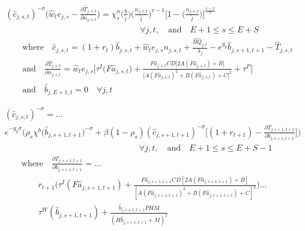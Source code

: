 \begin{spacing}{1.5}
    \begin{equation}\label{EqEulerLabStat}
      \begin{split}
        &(\hat{c}_{j,s,t})^{-\sigma}\Biggl(\hat{w}_t e_{j,s} - \frac{\partial\hat{T}_{j,s,t}}{\partial n_{j,s,t}}\Biggr) = \chi^n_{s}\biggl(\frac{b}{\tilde{l}}\biggr)\biggl(\frac{n_{j,s,t}}{\tilde{l}}\biggr)^{v-1}\Biggl[1 - \biggl(\frac{n_{j,s,t}}{\tilde{l}}\biggr)\Biggr]^{\frac{1-v}{v}} \\
        &\qquad\qquad\qquad\qquad\qquad\qquad\qquad\qquad\forall j,t, \quad\text{and}\quad E+1\leq s\leq E+S \\
        &\qquad\text{where}\quad \hat{c}_{j,s,t} = \left(1 + r_t\right)\hat{b}_{j,s,t} + \hat{w}_t e_{j,s}n_{j,s,t} + \frac{\hat{BQ}_{j,t}}{\lambda_j} - e^{g_y}\hat{b}_{j,s+1,t+1} - \hat{T}_{j,s,t} \\
        &\qquad\text{and}\quad \frac{\partial \hat{T}_{j,s,t}}{\partial n_{j,s,t}} = \hat{w}_t e_{j,s}\biggl[\tau^I\bigl(F\hat{a}_{j,s,t}\bigr) + \frac{F\hat{a}_{j,s,t}CD\bigl[2A(F\hat{a}_{j,s,t})+B\bigr]}{\bigl[A(F\hat{a}_{j,s,t})^2+B(F \hat{a}_{j,s,t})+C\bigr]^2} + \tau^P\Biggr] \\
        &\qquad\text{and}\quad \hat{b}_{j,E+1,t} = 0 \quad\forall j,t
      \end{split}
    \end{equation}

    \begin{equation}\label{EqEulerSavStat}
      \begin{split}
        &(\hat{c}_{j,s,t})^{-\sigma} = ... \\
        &e^{-g_y\sigma}\Biggl(\rho_s\chi^b \bigl(\hat{b}_{j,s+1,t+1}\bigr)^{-\sigma} + \beta(1-\rho_s)(\hat{c}_{j,s+1,t+1})^{-\sigma}\Biggl[(1 + r_{t+1}) - \frac{\partial T_{j,s+1,t+1}}{\partial b_{j,s+1,t+1}}\Biggr]\Biggr) \\
        &\qquad\qquad\qquad\qquad\qquad\qquad\qquad\qquad\forall j,t,\quad\text{and}\quad E+1\leq s \leq E+S-1 \\
        &\qquad\text{where}\quad \frac{\partial T_{j,s+1,t+1}}{\partial b_{j,s+1,t+1}} = ...\\
        &\qquad\qquad r_{t+1}\Biggl(\tau^I(F\hat{a}_{j,s+1,t+1}) + \frac{F\hat{a}_{j,s+1,t+1}CD\left[2A(F\hat{a}_{j,s+1,t+1}) + B\right]}{\left[A(F\hat{a}_{j,s+1,t+1})^2 + B(F\hat{a}_{j,s+1,t+1}) + C\right]^2}\Biggr) ... \\
        &\qquad\qquad \tau^W(\hat{b}_{j,s+1,t+1}) + \frac{\hat{b}_{j,s+1,t+1}PHM}{\left(H\hat{b}_{j,s+1,t+1} + M\right)^2}
      \end{split}
    \end{equation}


\end{spacing}

